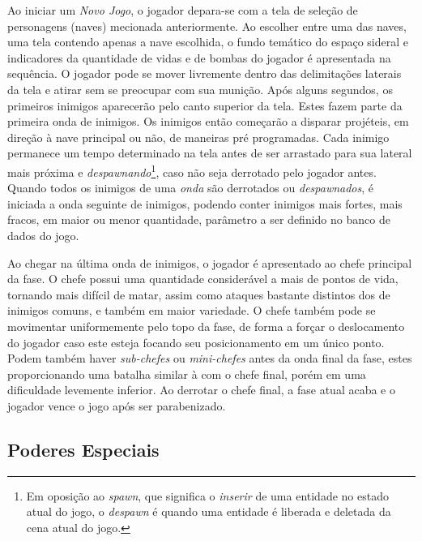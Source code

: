 Ao iniciar um \textit{Novo Jogo}, o jogador depara-se com a tela de seleção de personagens (naves) mecionada anteriormente. Ao escolher entre uma das naves, uma tela contendo apenas a nave escolhida, o fundo temático do espaço sideral e indicadores da quantidade de vidas e de bombas do jogador é apresentada na sequência. O jogador pode se mover livremente dentro das delimitações laterais da tela e atirar sem se preocupar com sua munição. Após alguns segundos, os primeiros inimigos aparecerão pelo canto superior da tela. Estes fazem parte da primeira onda de inimigos. Os inimigos então começarão a disparar projéteis, em direção à nave principal ou não, de maneiras pré programadas. Cada inimigo permanece um tempo determinado na tela antes de ser arrastado para sua lateral mais próxima e \textit{despawnando}\footnote{
    Em oposição ao \textit{spawn}, que significa o \textit{inserir} de uma entidade no estado atual do jogo, o \textit{despawn} é quando uma entidade é liberada e deletada da cena atual do jogo.
}, caso não seja derrotado pelo jogador antes. Quando todos os inimigos de uma \textit{onda} são derrotados ou \textit{despawnados}, é iniciada a onda seguinte de inimigos, podendo conter inimigos mais fortes, mais fracos, em maior ou menor quantidade, parâmetro a ser definido no banco de dados do jogo.

Ao chegar na última onda de inimigos, o jogador é apresentado ao chefe principal da fase. O chefe possui uma quantidade considerável a mais de pontos de vida, tornando mais difícil de matar, assim como ataques bastante distintos dos de inimigos comuns, e também em maior variedade. O chefe também pode se movimentar uniformemente pelo topo da fase, de forma a forçar o deslocamento do jogador caso este esteja focando seu posicionamento em um único ponto. Podem também haver \textit{sub-chefes} ou \textit{mini-chefes} antes da onda final da fase, estes proporcionando uma batalha similar à com o chefe final, porém em uma dificuldade levemente inferior. Ao derrotar o chefe final, a fase atual acaba e o jogador vence o jogo após ser parabenizado.

\subsection{Poderes Especiais}

